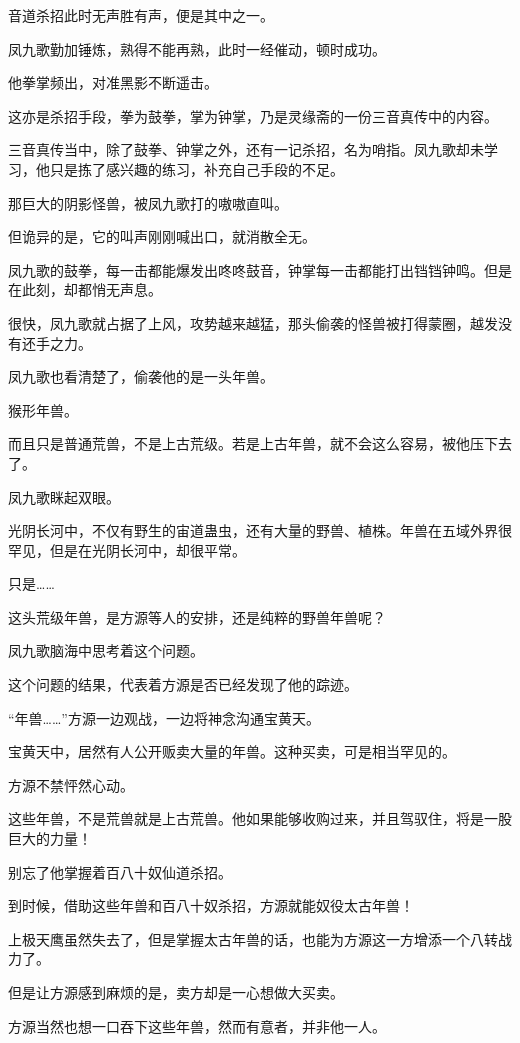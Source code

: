 \begin{this_body}
音道杀招此时无声胜有声，便是其中之一。

凤九歌勤加锤炼，熟得不能再熟，此时一经催动，顿时成功。

他拳掌频出，对准黑影不断遥击。

这亦是杀招手段，拳为鼓拳，掌为钟掌，乃是灵缘斋的一份三音真传中的内容。

三音真传当中，除了鼓拳、钟掌之外，还有一记杀招，名为哨指。凤九歌却未学习，他只是拣了感兴趣的练习，补充自己手段的不足。

那巨大的阴影怪兽，被凤九歌打的嗷嗷直叫。

但诡异的是，它的叫声刚刚喊出口，就消散全无。

凤九歌的鼓拳，每一击都能爆发出咚咚鼓音，钟掌每一击都能打出铛铛钟鸣。但是在此刻，却都悄无声息。

很快，凤九歌就占据了上风，攻势越来越猛，那头偷袭的怪兽被打得蒙圈，越发没有还手之力。

凤九歌也看清楚了，偷袭他的是一头年兽。

猴形年兽。

而且只是普通荒兽，不是上古荒级。若是上古年兽，就不会这么容易，被他压下去了。

凤九歌眯起双眼。

光阴长河中，不仅有野生的宙道蛊虫，还有大量的野兽、植株。年兽在五域外界很罕见，但是在光阴长河中，却很平常。

只是……

这头荒级年兽，是方源等人的安排，还是纯粹的野兽年兽呢？

凤九歌脑海中思考着这个问题。

这个问题的结果，代表着方源是否已经发现了他的踪迹。

“年兽……”方源一边观战，一边将神念沟通宝黄天。

宝黄天中，居然有人公开贩卖大量的年兽。这种买卖，可是相当罕见的。

方源不禁怦然心动。

这些年兽，不是荒兽就是上古荒兽。他如果能够收购过来，并且驾驭住，将是一股巨大的力量！

别忘了他掌握着百八十奴仙道杀招。

到时候，借助这些年兽和百八十奴杀招，方源就能奴役太古年兽！

上极天鹰虽然失去了，但是掌握太古年兽的话，也能为方源这一方增添一个八转战力了。

但是让方源感到麻烦的是，卖方却是一心想做大买卖。

方源当然也想一口吞下这些年兽，然而有意者，并非他一人。


\end{this_body}
